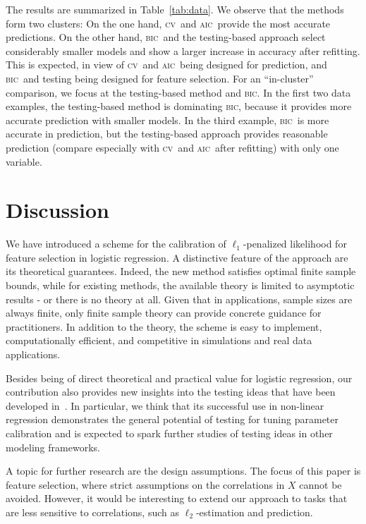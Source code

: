 \documentclass{elsarticle}
\def\AIC{\textsc{aic}}
\def\BIC{\textsc{bic}}
\def\CV{\textsc{cv}}
\begin{document}
The results are summarized in Table~\ref{tab:data}. We observe that  the methods form two clusters: On the one hand, \CV\ and \AIC\ provide the most accurate predictions. On the other hand, \BIC\ and the testing-based approach select considerably smaller models and show a larger increase in accuracy after refitting. This is expected, in view of \CV\ and \AIC\ being designed for prediction, and \BIC\ and testing being designed for feature selection. For an ``in-cluster'' comparison, we focus at the testing-based method and \BIC. In the first two data examples, the testing-based method is  dominating \BIC, because it provides more accurate prediction with smaller models. In the third example, \BIC\ is more accurate in prediction, but the testing-based approach provides reasonable prediction (compare especially with \CV\ and \AIC\ after refitting) with only one variable.



\section{Discussion}\label{sec:dis}


We have introduced a scheme for the calibration of $\ell_1$-penalized likelihood for feature selection in logistic regression.  A distinctive feature of the approach  are its theoretical guarantees. Indeed, the new method satisfies optimal finite sample bounds, while for existing methods, the available theory is limited to asymptotic results - or there is no theory at all. Given that in applications, sample sizes are always finite, only  finite sample  theory can provide concrete guidance for practitioners. In addition to the theory, the scheme is easy to implement, computationally efficient, and competitive in simulations and real data applications.

Besides being of direct theoretical and practical value for logistic regression, our contribution also provides new insights into the testing ideas that have been developed in~\cite{chichignoud2016practical}. In particular, we think that its successful use in non-linear regression demonstrates the general potential of testing for tuning parameter calibration and is expected to spark further studies of testing ideas in other modeling frameworks.

A topic for further research are the design assumptions. The focus of this paper is feature selection, where strict assumptions on the correlations in $X$ cannot be avoided. However, it would be interesting to extend our approach  to tasks that are less sensitive to correlations, such as $\ell_2$-estimation and prediction.
\end{document}
